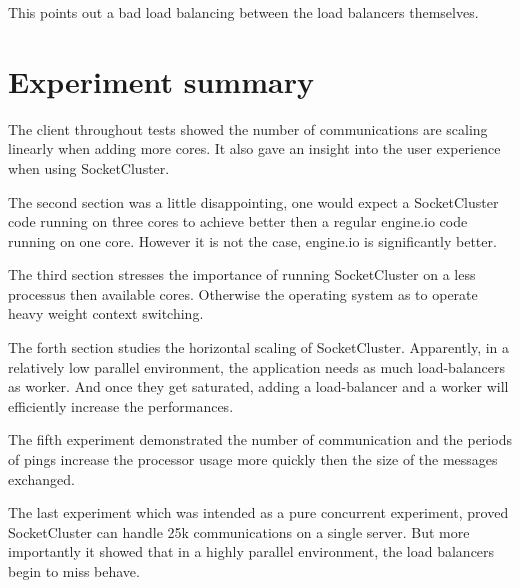 This points out a bad load balancing between the load balancers themselves.

\section{Experiment summary}

The client throughout tests showed the number of communications are scaling
linearly when adding more cores. It also gave an insight into the user
experience when using SocketCluster.

The second section was a little disappointing, one would expect a SocketCluster
code running on three cores to achieve better then a regular engine.io code
running on one core. However it is not the case, engine.io is significantly
better.

The third section stresses the importance of running SocketCluster on a less
processus then available cores. Otherwise the operating system as to operate
heavy weight context switching.

The forth section studies the horizontal scaling of SocketCluster. Apparently,
in a relatively low parallel environment, the application needs as much
load-balancers as worker. And once they get saturated, adding a load-balancer
and a worker will efficiently increase the performances.

The fifth experiment demonstrated the number of communication and the periods
of pings increase the processor usage more quickly then the size of the
messages exchanged.

The last experiment which was intended as a pure concurrent experiment, proved
SocketCluster can handle 25k communications on a single server. But more
importantly it showed that in a highly parallel environment, the load balancers
begin to miss behave.











